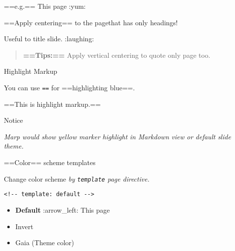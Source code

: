 \documentclass[ignorenonframetext,]{beamer}
\newenvironment{Shaded}{\begin{snugshade}}{\end{snugshade}}
\newcommand{\NormalTok}[1]{{#1}}
\providecommand{\tightlist}{%
  \setlength{\itemsep}{0pt}\setlength{\parskip}{0pt}}
\begin{document}
\begin{frame}{==e.g.== This page :yum:}

\end{frame}

\begin{frame}

\begin{block}{==Apply centering== to the pagethat has only headings!}

\begin{block}{Useful to title slide. :laughing:}

\end{block}

\end{block}

\end{frame}

\begin{frame}[fragile]

\begin{quote}
\textbf{==Tips:==} Apply vertical centering to quote only page too.
\end{quote}

\begin{block}{Highlight Markup}

You can use \texttt{==} for ==highlighting blue==.

\begin{Shaded}
\begin{Highlighting}[]
\NormalTok{==This is highlight markup.==}
\end{Highlighting}
\end{Shaded}

\begin{block}{Notice}

\emph{Marp would show yellow marker highlight in Markdown view or
default slide theme.}

\end{block}

\end{block}

\end{frame}

\begin{frame}[fragile]{==Color== scheme templates}

Change color scheme \emph{by \texttt{template} page directive.}

\begin{verbatim}
<!-- template: default -->
\end{verbatim}

\begin{itemize}
\tightlist
\item
  \textbf{Default} :arrow\_left: This page
\item
  Invert
\item
  Gaia (Theme color)
\end{itemize}

\end{frame}
\end{document}
